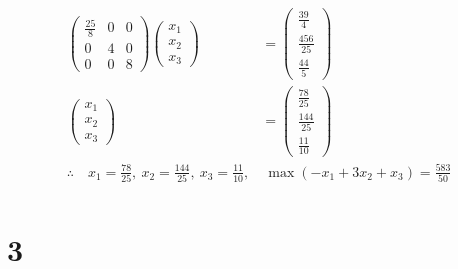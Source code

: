 \documentclass[a4paper,12pt]{article}
\begin{document}
\begin{align*}
    \begin{pmatrix}\frac{25}{8} & 0 & 0 \\ 0 & 4 & 0 \\ 0 & 0 & 8\end{pmatrix} \begin{pmatrix}x_1 \\ x_2 \\ x_3\end{pmatrix} & = \begin{pmatrix}\frac{39}{4} \\ \frac{456}{25} \\ \frac{44}{5}\end{pmatrix}   \\
    \begin{pmatrix}x_1 \\ x_2 \\ x_3\end{pmatrix}                                                                            & = \begin{pmatrix}\frac{78}{25} \\ \frac{144}{25} \\ \frac{11}{10}\end{pmatrix} \\
    \therefore \quad x_1 = \frac{78}{25}, \ x_2 = \frac{144}{25}, \ x_3 = \frac{11}{10},                                     & \ \max{(-x_1 + 3 x_2 + x_3)} = \frac{583}{50}                                  \\
\end{align*}

\section*{3}
\end{document}
